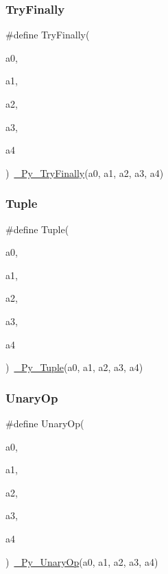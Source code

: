 \mbox{\label{_python-ast_8h_a72f1c5def10d26a6fd8c0d19dcdd4b08}} 
\subsubsection{\texorpdfstring{TryFinally}{TryFinally}}
{\footnotesize\ttfamily \#define Try\+Finally(\begin{DoxyParamCaption}\item[{}]{a0,  }\item[{}]{a1,  }\item[{}]{a2,  }\item[{}]{a3,  }\item[{}]{a4 }\end{DoxyParamCaption})~\mbox{\hyperlink{_python-ast_8h_acb1710941c4c76ee877ee4135ced2b96}{\+\_\+\+Py\+\_\+\+Try\+Finally}}(a0, a1, a2, a3, a4)}

\mbox{\label{_python-ast_8h_a3f332c0be139cb870e516bad9b6a9366}} 
\subsubsection{\texorpdfstring{Tuple}{Tuple}}
{\footnotesize\ttfamily \#define Tuple(\begin{DoxyParamCaption}\item[{}]{a0,  }\item[{}]{a1,  }\item[{}]{a2,  }\item[{}]{a3,  }\item[{}]{a4 }\end{DoxyParamCaption})~\mbox{\hyperlink{_python-ast_8h_adcbcc2836882c9eda8680dffb9cde4d5}{\+\_\+\+Py\+\_\+\+Tuple}}(a0, a1, a2, a3, a4)}

\mbox{\label{_python-ast_8h_a58d061c3512544360f86829dd63f4dd8}} 
\subsubsection{\texorpdfstring{UnaryOp}{UnaryOp}}
{\footnotesize\ttfamily \#define Unary\+Op(\begin{DoxyParamCaption}\item[{}]{a0,  }\item[{}]{a1,  }\item[{}]{a2,  }\item[{}]{a3,  }\item[{}]{a4 }\end{DoxyParamCaption})~\mbox{\hyperlink{_python-ast_8h_a988c2f43347c9e208c14ee54290474ec}{\+\_\+\+Py\+\_\+\+Unary\+Op}}(a0, a1, a2, a3, a4)}

